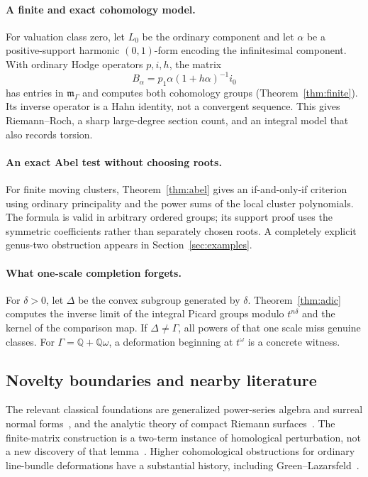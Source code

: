 \documentclass[11pt,letterpaper]{article}
\numberwithin{equation}{section}
\theoremstyle{definition}
\theoremstyle{remark}
\newcommand{\Q}{\mathbb Q}
\newcommand{\mm}{\mathfrak m}
\newcommand{\mg}{\mm_\Gamma}
\begin{document}
\paragraph{A finite and exact cohomology model.}
For valuation class zero, let $L_0$ be the ordinary component and let
$\alpha$ be a positive-support harmonic $(0,1)$-form encoding the
infinitesimal component. With ordinary Hodge operators $p,i,h$, the matrix
\[
 B_\alpha=p_1\alpha(1+h\alpha)^{-1}i_0
\]
has entries in $\mg$ and computes both cohomology groups
(Theorem~\ref{thm:finite}). Its inverse operator is a Hahn identity,
not a convergent sequence. This gives Riemann--Roch, a sharp large-degree
section count, and an integral model that also records torsion.

\paragraph{An exact Abel test without choosing roots.}
For finite moving clusters, Theorem~\ref{thm:abel} gives an if-and-only-if
criterion using ordinary principality and the power sums of the local
cluster polynomials. The formula is valid in arbitrary ordered groups;
its support proof uses the symmetric coefficients rather than separately
chosen roots. A completely explicit genus-two obstruction appears in
Section~\ref{sec:examples}.

\paragraph{What one-scale completion forgets.}
For $\delta>0$, let $\Delta$ be the convex subgroup generated by $\delta$.
Theorem~\ref{thm:adic} computes the inverse limit of the integral
Picard groups modulo $t^{n\delta}$ and the kernel of the comparison map.
If $\Delta\ne\Gamma$, all powers of that one scale miss genuine classes.
For $\Gamma=\Q+\Q\omega$, a deformation beginning at $t^\omega$ is a
concrete witness.

\subsection{Novelty boundaries and nearby literature}
The relevant classical foundations are generalized power-series algebra
and surreal normal forms~\cite{neumann,gonshor,mantova}, and the analytic
theory of compact Riemann surfaces~\cite{narasimhan}. The finite-matrix
construction is a two-term instance of homological perturbation, not a
new discovery of that lemma~\cite{crainic}. Higher cohomological
obstructions for ordinary line-bundle deformations have a substantial
history, including Green--Lazarsfeld~\cite{greenlazarsfeld}.
\end{document}
